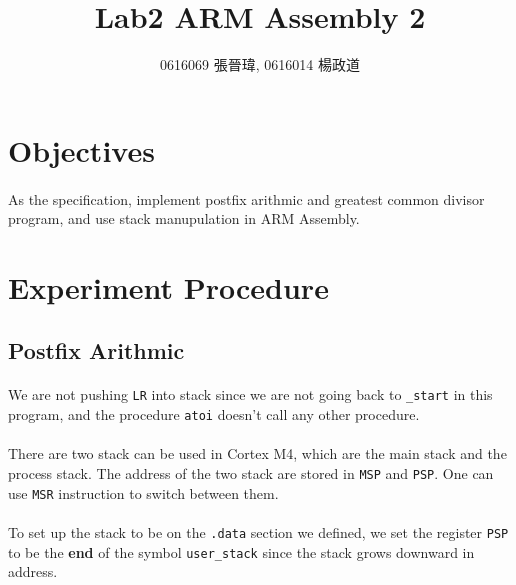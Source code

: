 \title{Lab2 ARM Assembly 2}
\author{0616069 張晉瑋, 0616014 楊政道}
\maketitle
\thispagestyle{fancy}
\section{Objectives}
\paragraph{}
As the specification, implement postfix arithmic and greatest common divisor program, and use stack manupulation in ARM Assembly.
\section{Experiment Procedure}
\subsection{Postfix Arithmic}
\paragraph{}
We are not pushing \texttt{LR} into stack since we are not going back to \texttt{\_start} in this program, and the procedure \texttt{atoi} doesn't call any other procedure.
\paragraph{}
There are two stack can be used in Cortex M4, which are the main stack and the process stack. The address of the two stack are stored in \texttt{MSP} and \texttt{PSP}. One can use \texttt{MSR} instruction to switch between them.
\paragraph{}
To set up the stack to be on the \texttt{.data} section we defined, we set the register \texttt{PSP} to be the \textbf{end} of the symbol \texttt{user\_stack} since the stack grows downward in address.
